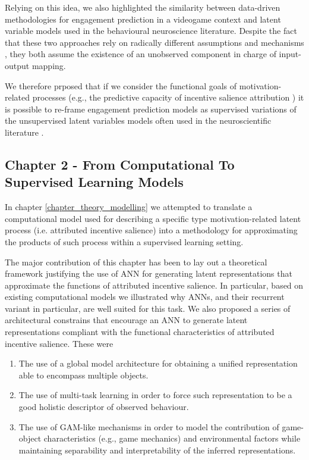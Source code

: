 Relying on this idea, we also highlighted the similarity between data-driven methodologies for engagement prediction in a videogame context and latent variable models used in the behavioural neuroscience literature. Despite the fact that these two approaches rely on radically different assumptions and mechanisms \cite{murphy2022probabilistic}, they both assume the existence of an unobserved component in charge of input-output mapping.

We therefore prposed that if we consider the functional goals of motivation-related processes (e.g., the predictive capacity of incentive salience attribution \cite{berridge2004motivation}) it is possible to re-frame engagement prediction models as supervised variations of the unsupervised latent variables models often used in the neuroscientific literature \cite{luxem2020identifying, mccullough2021unsupervised}.

\subsection{Chapter 2 - From Computational To Supervised Learning Models}
\label{discussion_chapter_two}
In chapter \ref{chapter_theory_modelling} we attempted to translate a computational model used for describing a specific type motivation-related latent process (i.e. attributed incentive salience) into a methodology for approximating the products of such process within a supervised learning setting.

The major contribution of this chapter has been to lay out a theoretical framework justifying the use of ANN for generating latent representations that approximate the functions of attributed incentive salience. In particular, based on existing computational models \cite{mcclure2003computational, zhang2009neural} we illustrated why ANNs, and their recurrent variant in particular, are well suited for this task. We also proposed a series of architectural constrains that encourage an ANN to generate latent representations compliant with the functional characteristics of attributed incentive salience. These were

\begin{enumerate}
    \item The use of a global model architecture for obtaining a unified representation able to encompass multiple objects.
    \item The use of multi-task learning in order to force such representation to be a good holistic descriptor of observed behaviour.
    \item The use of GAM-like mechanisms in order to model the contribution of game-object characteristics (e.g., game mechanics) and environmental factors while maintaining separability and interpretability of the inferred representations.
\end{enumerate}

